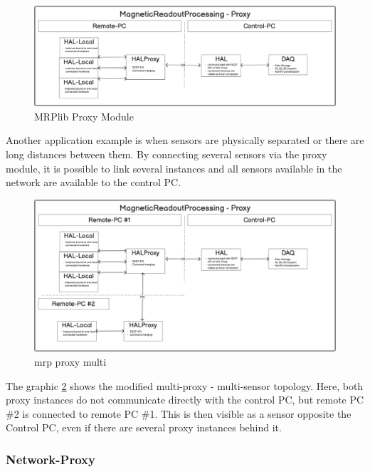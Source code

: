 \begin{figure}
\centering
\includegraphics{./generated_images/border_MRPlib_Proxy_Module.png}
\caption{MRPlib Proxy Module \label{MRPlib_Proxy_Module.png}}
\end{figure}

Another application example is when sensors are physically separated or
there are long distances between them. By connecting several sensors via
the proxy module, it is possible to link several instances and all
sensors available in the network are available to the control PC.

\begin{figure}
\centering
\includegraphics{./generated_images/border_mrp_proxy_multi.png}
\caption{mrp proxy multi \label{mrp_proxy_multi.png}}
\end{figure}

The graphic \ref{mrp_proxy_multi.png} shows the modified multi-proxy -
multi-sensor topology. Here, both proxy instances do not communicate
directly with the control PC, but remote PC \#2 is connected to remote
PC \#1. This is then visible as a sensor opposite the Control PC, even
if there are several proxy instances behind it.

\hypertarget{network-proxy}{%
\subsubsection{Network-Proxy}\label{network-proxy}}

